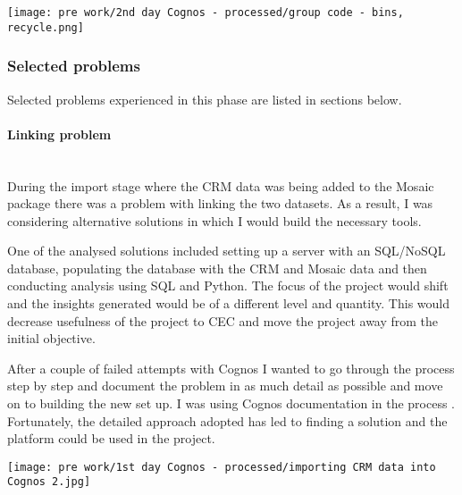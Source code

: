 \begin{center}
  \texttt{[image: pre work/2nd day Cognos - processed/group code - bins, recycle.png]}
\end{center}


			\subsubsection{Selected problems}
			
Selected problems experienced in this phase are listed in sections below.			
			
				\paragraph{Linking problem}\mbox{}\\
During the import stage where the CRM data was being added to the Mosaic package there was a problem with linking the two datasets. As a result, I was considering alternative solutions in which I would build the necessary tools.

One of the analysed solutions included setting up a server with an SQL/NoSQL database, populating the database with the CRM and Mosaic data and then conducting analysis using SQL and Python. The focus of the project would shift and the insights generated would be of a different level and quantity. This would decrease usefulness of the project to CEC and move the project away from the initial objective.

After a couple of failed attempts with Cognos I wanted to go through the process step by step and document the problem in as much detail as possible and move on to building the new set up. I was using Cognos documentation in the process \citep{IBM2015, IBM2015c}. Fortunately, the detailed approach adopted has led to finding a solution and the platform could be used in the project.

\begin{center}
  \texttt{[image: pre work/1st day Cognos - processed/importing CRM data into Cognos 2.jpg]}
\end{center}
	
